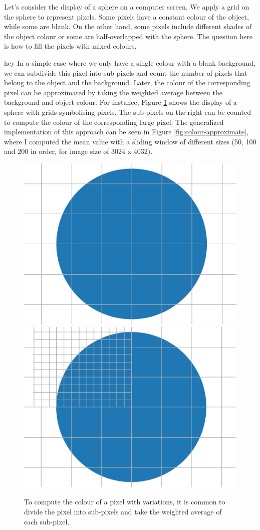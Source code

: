 Let's consider the display of a sphere on a computer screen. We apply a grid on the sphere to represent pixels. Some pixels have a constant colour of the object, while some are blank. On the other hand, some pixels include different shades of the object colour or some are half-overlapped with the sphere. The question here is how to fill the pixels with mixed colours. 

hey
In a simple case where we only have a single colour with a blank background, we can subdivide this pixel into sub-pixels and count the number of pixels that belong to the object and the background. Later, the colour of the corresponding pixel can be approximated by taking the weighted average between the background and object colour. For instance, Figure \ref{fig:display-grid} shows the display of a sphere with grids symbolising pixels. The sub-pixels on the right can be counted to compute the colour of the corresponding large pixel. The generalized implementation of this approach can be seen in Figure \ref{fig:colour-approximate}, where I computed the mean value with a sliding window of different sizes (50, 100 and 200 in order, for image size of 3024 x 4032).

\begin{figure}
  \centering
   \includegraphics[width=0.48\linewidth]{Images/grid_circle.png}
    \includegraphics[width=0.48\linewidth]{Images/merged_grid_circle2-crop.pdf}

   \caption{To compute the colour of a pixel with variations, it is common to divide the pixel into sub-pixels and take the weighted average of each sub-pixel.}
   \label{fig:display-grid}
\end{figure}


